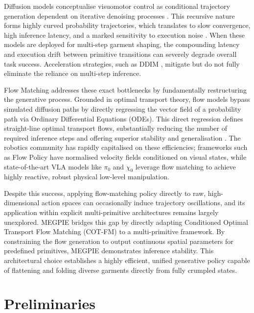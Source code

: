 \documentclass[journal]{IEEEtran}
\begin{document}
Diffusion models conceptualise visuomotor control as conditional trajectory generation dependent on iterative denoising processes \cite{ho2020denoising}. This recursive nature forms highly curved probability trajectories, which translates to slow convergence, high inference latency, and a marked sensitivity to execution noise \cite{black2024pi0}. When these models are deployed for multi-step garment shaping, the compounding latency and execution drift between primitive transitions can severely degrade overall task success. Acceleration strategies, such as DDIM \cite{song2020denoising}, mitigate but do not fully eliminate the reliance on multi-step inference.

Flow Matching \cite{lipman2022flow, chen2023flow} addresses these exact bottlenecks by fundamentally restructuring the generative process. Grounded in optimal transport theory, flow models bypass simulated diffusion paths by directly regressing the vector field of a probability path via Ordinary Differential Equations (ODEs). This direct regression defines straight-line optimal transport flows, substantially reducing the number of required inference steps and offering superior stability and generalisation \cite{zhang2025flowpolicy}. The robotics community has rapidly capitalised on these efficiencies; frameworks such as Flow Policy \cite{zhang2025flowpolicy} have normalised velocity fields conditioned on visual states, while state-of-the-art VLA models like $\pi_0$ \cite{black2024pi0} and $\chi_0$ \cite{yu2026chi_} leverage flow matching to achieve highly reactive, robust physical low-level manipulation.

Despite this success, applying flow-matching policy directly to raw, high-dimensional action spaces can occasionally induce trajectory oscillations, and its application within explicit multi-primitive architectures remains largely unexplored. MEGPIE bridges this gap by directly adapting Conditioned Optimal Transport Flow Matching (COT-FM) to a multi-primitive framework. By constraining the flow generation to output continuous spatial parameters for predefined primitives, MEGPIE demonstrates inference stability. This architectural choice establishes a highly efficient, unified generative policy capable of flattening and folding diverse garments directly from fully crumpled states.


\section{Preliminaries} \label{sec:preliminaries}
\end{document}
